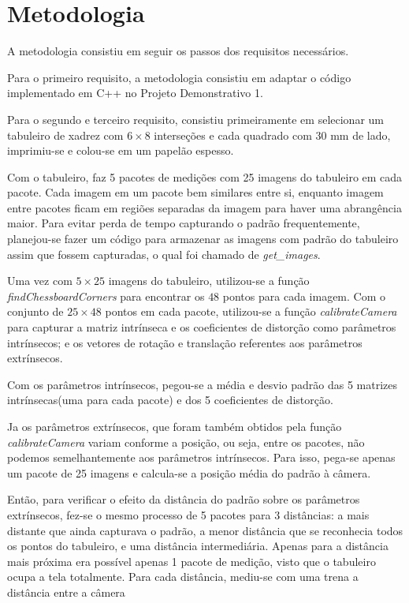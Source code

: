 \section{Metodologia}
\label{metodologia}

A metodologia consistiu em seguir os passos dos requisitos necessários. 

Para o primeiro requisito, a metodologia consistiu em adaptar o código implementado em C++ no Projeto Demonstrativo 1.

Para o segundo e terceiro requisito, consistiu primeiramente em selecionar um tabuleiro de xadrez com $6\times 8$ interseções e cada quadrado com $30$ mm de lado, imprimiu-se e colou-se em um papelão espesso.

Com o tabuleiro, faz 5 pacotes de medições com 25 imagens do tabuleiro em cada pacote. Cada imagem em um pacote bem similares entre si, enquanto imagem entre pacotes ficam em regiões separadas da imagem para haver uma abrangência maior. Para evitar perda de tempo capturando o padrão frequentemente, planejou-se fazer um código para armazenar as imagens com padrão do tabuleiro assim que fossem capturadas, o qual foi chamado de \textit{get\_images}.

Uma vez com $5 \times 25$ imagens do tabuleiro, utilizou-se a função \textit{findChessboardCorners}\cite{CameraCalibration} para encontrar os $48$ pontos para cada imagem. Com o conjunto de $25 \times 48$ pontos em cada pacote, utilizou-se a função \textit{calibrateCamera}\cite{CameraCalibration} para capturar a matriz intrínseca e os coeficientes de distorção como parâmetros intrínsecos; e os vetores de rotação e translação referentes aos parâmetros extrínsecos.

Com os parâmetros intrínsecos, pegou-se a média e desvio padrão das 5 matrizes intrínsecas(uma para cada pacote) e dos 5 coeficientes de distorção. 

Ja os parâmetros extrínsecos, que foram também obtidos pela função \textit{calibrateCamera} variam conforme a posição, ou seja, entre os pacotes, não podemos semelhantemente aos parâmetros intrínsecos. Para isso, pega-se apenas um pacote de 25 imagens e calcula-se a posição média do padrão à câmera.

Então, para verificar o efeito da distância do padrão sobre os parâmetros extrínsecos, fez-se o mesmo processo de 5 pacotes para 3 distâncias: a mais distante que ainda capturava o padrão, a menor distância que se reconhecia todos os pontos do tabuleiro, e uma distância intermediária. Apenas para a distância mais próxima era possível apenas 1 pacote de medição, visto que o tabuleiro ocupa a tela totalmente. Para cada distância, mediu-se com uma trena a distância entre a câmera 


